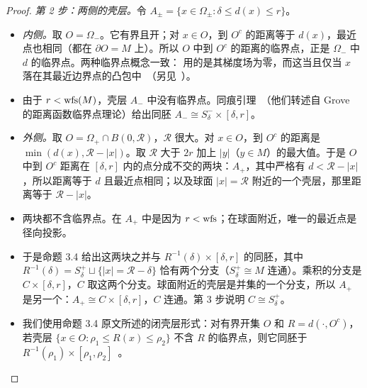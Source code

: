 \begin{proof}
\emph{第 2 步：两侧的壳层。}令 $A_\pm=\{x\in\Omega_\pm:\delta\le d(x)\le r\}$。
\begin{itemize}
\item \emph{内侧。}取 $O=\Omega_-$。它有界且开；对 $x\in O$，到 $O^c$ 的距离等于 $d(x)$，最近点也相同（都在 $\partial O=M$ 上）。所以 $O$ 中到 $O^c$ 的距离的临界点，正是 $\Omega_-$ 中 $d$ 的临界点。两种临界点概念一致：\cite{ChazalLieutier07} 用的是其梯度场为零，而这当且仅当 $x$ 落在其最近边界点的凸包中~\cite[Lemma~2.2]{ChazalLieutier07}（另见~\cite[\S2.2]{CCSL09dcg}）。
\item 由于 $r<\operatorname{wfs}(M)$，壳层 $A_-$ 中没有临界点。同痕引理~\cite[Prop.~3.4]{ChazalLieutier07}（他们转述自 Grove 的距离函数临界点理论）给出同胚 $A_-\cong S^-_\delta\times[\delta,r]$。
\item \emph{外侧。}取 $O=\Omega_+\cap B(0,\mathcal R)$，$\mathcal R$ 很大。对 $x\in O$，到 $O^c$ 的距离是 $\min(d(x),\mathcal R-|x|)$。取 $\mathcal R$ 大于 $2r$ 加上 $|y|$（$y\in M$）的最大值。于是 $O$ 中到 $O^c$ 距离在 $[\delta,r]$ 内的点分成不交的两块：$A_+$，其中严格有 $d<\mathcal R-|x|$，所以距离等于 $d$ 且最近点相同；以及球面 $|x|=\mathcal R$ 附近的一个壳层，那里距离等于 $\mathcal R-|x|$。
\item 两块都不含临界点。在 $A_+$ 中是因为 $r<\operatorname{wfs}$；在球面附近，唯一的最近点是径向投影。
\item 于是命题 3.4 给出这两块之并与 $R^{-1}(\delta)\times[\delta,r]$ 的同胚，其中 $R^{-1}(\delta)=S^+_\delta\sqcup\{|x|=\mathcal R-\delta\}$ 恰有两个分支（$S^+_\delta\cong M$ 连通）。乘积的分支是 $C\times[\delta,r]$，$C$ 取这两个分支。球面附近的壳层是并集的一个分支，所以 $A_+$ 是另一个：$A_+\cong C\times[\delta,r]$，$C$ 连通。第 3 步说明 $C\cong S^+_\delta$。
\item 我们使用命题 3.4 原文所述的闭壳层形式：对有界开集 $O$ 和 $R=d(\cdot,O^c)$，若壳层 $\{x\in O:\rho_1\le R(x)\le\rho_2\}$ 不含 $R$ 的临界点，则它同胚于 $R^{-1}(\rho_1)\times[\rho_1,\rho_2]$~\cite[Prop.~3.4]{ChazalLieutier07}。
\end{itemize}


\end{proof}

